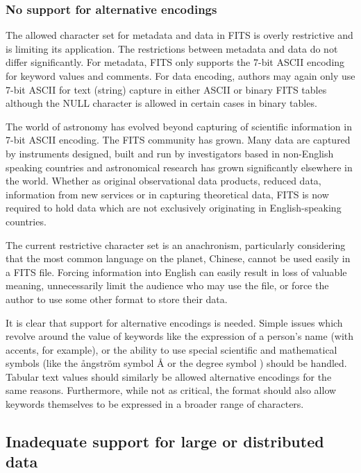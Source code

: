 \documentclass[final,authoryear,5p,times,twocolumn]{elsarticle}
\begin{document}
{{\subsubsection{No support for alternative encodings}
\label{section_char_encoding}

The allowed character set for metadata and data in FITS is overly
restrictive and is limiting its application. The restrictions between
metadata and data do not differ significantly. For metadata, 
FITS only supports the 7-bit
ASCII encoding for keyword values and comments. For data encoding,
authors may again only use 7-bit ASCII for text (string) capture in
either ASCII or binary FITS tables although the NULL character is
allowed in certain cases in binary tables.


The world of astronomy has evolved beyond capturing of scientific
information in 7-bit ASCII encoding. The FITS community has grown.
Many data are captured by instruments designed, built and run by
investigators based in non-English speaking countries and astronomical
research has grown significantly elsewhere in the world. Whether as
original observational data products, reduced data, information from new
services or in capturing theoretical data, FITS is now required to hold
data which are not exclusively originating in English-speaking countries.


The current restrictive character set is an
anachronism, particularly considering that the most common language on the planet,
Chinese, cannot be used easily in a FITS file. Forcing information
into English can easily result in loss of valuable meaning, unnecessarily
limit the audience who may use the file, or force the author to use some other
format to store their data.


It is clear that support for alternative encodings is needed.
Simple issues which revolve around the value of keywords like the
expression of a person's name (with accents, for example), or the
ability to use special scientific and mathematical symbols (like the
\r{a}ngstr\"{o}m symbol \r{A} or the degree symbol \degree) should be
handled. Tabular text values should similarly be allowed alternative
encodings for the same reasons.  Furthermore, while not as critical, the
format should also allow keywords themselves to be expressed in a broader
range of characters.


\subsection{Inadequate support for large or distributed data}
\label{section_poor_large_data_support}

}}
\end{document}
